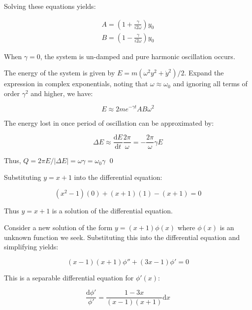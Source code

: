 \documentclass[12pt]{article}
\begin{document}
Solving these equations yields:

\begin{equation}
    \begin{split}
        A = (1 + \frac{\gamma}{i2 \omega}) y_{0} \\
        B = (1 - \frac{\gamma}{i2 \omega}) y_{0}
    \end{split}
\end{equation}

When $\gamma = 0$, the system is un-damped and pure harmonic oscillation occurs.


The energy of the system is given by $E = m(\omega^{2}y^{2} + \dot{y}^{2})/2$. Expand the expression in complex exponentials, noting that $\omega \approx \omega_{0}$ and ignoring all terms of order $\gamma^{2}$ and higher, we have:

\begin{equation}
    E \approx 2m e^{-\gamma t}AB \omega^{2}
\end{equation}

The energy lost in once period of oscillation can be approximated by:

\begin{equation}
    \Delta E \approx \frac{\mathrm{d}E}{\mathrm{d}t} \frac{2\pi}{\omega} = - \frac{2\pi}{\omega} \gamma E
\end{equation}

Thus, $Q = 2\pi E/\left\lvert \Delta E \right\rvert = \omega \gamma = \omega_{0} \gamma$
\qed


Substituting $y = x + 1$ into the differential equation:

\begin{equation}
    (x^{2} - 1)(0) + (x + 1)(1) - (x + 1) = 0
\end{equation}

Thus $y = x + 1$ is a solution of the differential equation.

Consider a new solution of the form $y = (x + 1)\phi(x)$ where $\phi(x)$ is an unknown function we seek. Substituting this into the differential equation and simplifying yields:

\begin{equation}
    (x - 1)(x + 1)\phi'' + (3x - 1)\phi' = 0
\end{equation}

This is a separable differential equation for $\phi'(x)$:

\begin{equation}
    \frac{\mathrm{d}\phi'}{\phi'} = \frac{1 - 3x}{(x - 1)(x + 1)} \mathrm{d}x
\end{equation}
\end{document}
